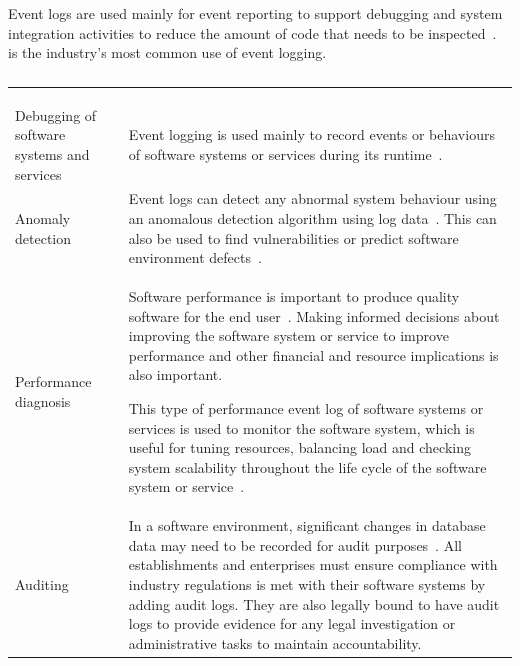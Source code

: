 Event logs are used mainly for event reporting to support debugging and system integration activities to reduce the amount of code that needs to be inspected~\cite{Baccanico2014}.~ is the industry's most common use of event logging.

\begin{xltabular}{\textwidth}{p{4cm}X}
	\caption[Event logs usage]
	{\textit{Event logs usage}}
	\label{tbl:ch1_eventLogsUsage} \\
	\toprule
	 &  \\
	\midrule
	\endfirsthead

	\caption[]{\continueCaption} \\
	\toprule
	 &  \\
	\midrule
	\endhead

	\midrule
	 \\ 
	\endfoot
	\endlastfoot

	\RaggedRight Debugging of software systems and services & \RaggedRight Event logging is used mainly to record events or behaviours of software systems or services during its runtime~\cite{Rong2018a}. \\

	\RaggedRight Anomaly detection & \RaggedRight Event logs can detect any abnormal system behaviour using an anomalous detection algorithm using log data~\cite{Gurumdimma2016}. This can also be used to find vulnerabilities or predict software environment defects~\cite{Dwyer2013}. \\

	Performance diagnosis & \RaggedRight Software performance is important to produce quality software for the end user~\cite{EvangelinGeetha2007, Baccanico2014}. Making informed decisions about improving the software system or service to improve performance and other financial and resource implications is also important. \par This type of performance event log of software systems or services is used to monitor the software system, which is useful for tuning resources, balancing load and checking system scalability throughout the life cycle of the software system or service~\cite{Song2017}. \\
	
	Auditing & \RaggedRight In a software environment, significant changes in database data may need to be recorded for audit purposes~\cite{Rong2018a}. All establishments and enterprises must ensure compliance with industry regulations is met with their software systems by adding audit logs. They are also legally bound to have audit logs to provide evidence for any legal investigation or administrative tasks to maintain accountability. \\


\end{xltabular}
